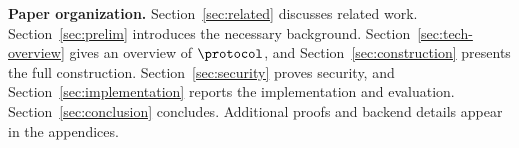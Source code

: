 \noindent\textbf{Paper organization.}
Section~\ref{sec:related} discusses related work.
Section~\ref{sec:prelim} introduces the necessary background.
Section~\ref{sec:tech-overview} gives an overview of \(\protocol\), and
Section~\ref{sec:construction} presents the full construction.
Section~\ref{sec:security} proves security, and
Section~\ref{sec:implementation} reports the implementation and evaluation.
Section~\ref{sec:conclusion} concludes.
Additional proofs and backend details appear in the appendices.
